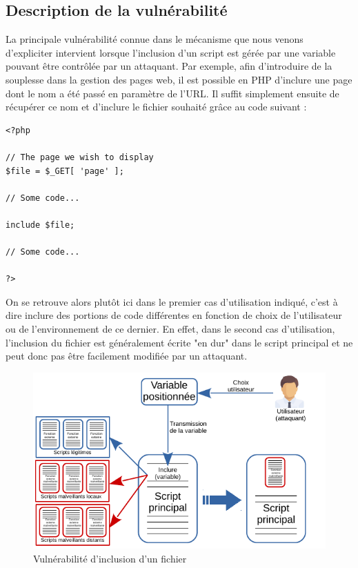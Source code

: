 \subsection{Description de la vulnérabilité}

La principale vulnérabilité connue dans le mécanisme que nous venons d'expliciter intervient lorsque l'inclusion d'un script est gérée par une variable pouvant être contrôlée par un attaquant. Par exemple, afin d'introduire de la souplesse dans la gestion des pages web, il est possible en PHP d'inclure une page dont le nom a été passé en paramètre de l'URL. Il suffit simplement ensuite de récupérer ce nom et d'inclure le fichier souhaité grâce au code suivant :

\begin{lstlisting}
<?php

// The page we wish to display
$file = $_GET[ 'page' ];

// Some code...

include $file;

// Some code...

?> 
\end{lstlisting}

On se retrouve alors plutôt ici dans le premier cas d'utilisation indiqué, c'est à dire inclure des portions de code différentes en fonction de choix de l'utilisateur ou de l'environnement de ce dernier. En effet, dans le second cas d'utilisation, l'inclusion du fichier est généralement écrite "en dur" dans le script principal et ne peut donc pas être facilement modifiée par un attaquant.

\begin{figure}[!h]
\begin{center}


\includegraphics[scale=1.4]{images/include_hacked.pdf}

\caption{Vulnérabilité d'inclusion d'un fichier}
\label{inclusion_hacked}
\end{center}
\end{figure}

